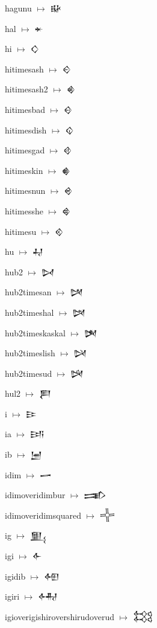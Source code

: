 {\noindent hagunu $\mapsto$ {\cufont 𒄫}\par
\noindent hal $\mapsto$ {\cufont 𒄬}\par
\noindent hi $\mapsto$ {\cufont 𒄭}\par
\noindent hitimesash $\mapsto$ {\cufont 𒄮}\par
\noindent hitimesash2 $\mapsto$ {\cufont 𒄯}\par
\noindent hitimesbad $\mapsto$ {\cufont 𒄰}\par
\noindent hitimesdish $\mapsto$ {\cufont 𒄱}\par
\noindent hitimesgad $\mapsto$ {\cufont 𒄲}\par
\noindent hitimeskin $\mapsto$ {\cufont 𒄳}\par
\noindent hitimesnun $\mapsto$ {\cufont 𒄴}\par
\noindent hitimesshe $\mapsto$ {\cufont 𒄵}\par
\noindent hitimesu $\mapsto$ {\cufont 𒄶}\par
\noindent hu $\mapsto$ {\cufont 𒄷}\par
\noindent hub2 $\mapsto$ {\cufont 𒄸}\par
\noindent hub2timesan $\mapsto$ {\cufont 𒄹}\par
\noindent hub2timeshal $\mapsto$ {\cufont 𒄺}\par
\noindent hub2timeskaskal $\mapsto$ {\cufont 𒄻}\par
\noindent hub2timeslish $\mapsto$ {\cufont 𒄼}\par
\noindent hub2timesud $\mapsto$ {\cufont 𒄽}\par
\noindent hul2 $\mapsto$ {\cufont 𒄾}\par
\noindent i $\mapsto$ {\cufont 𒄿}\par
\noindent ia $\mapsto$ {\cufont 𒅀}\par
\noindent ib $\mapsto$ {\cufont 𒅁}\par
\noindent idim $\mapsto$ {\cufont 𒅂}\par
\noindent idimoveridimbur $\mapsto$ {\cufont 𒅃}\par
\noindent idimoveridimsquared $\mapsto$ {\cufont 𒅄}\par
\noindent ig $\mapsto$ {\cufont 𒅅}\par
\noindent igi $\mapsto$ {\cufont 𒅆}\par
\noindent igidib $\mapsto$ {\cufont 𒅇}\par
\noindent igiri $\mapsto$ {\cufont 𒅈}\par
\noindent igioverigishirovershirudoverud $\mapsto$ {\cufont 𒅉}\par
}

